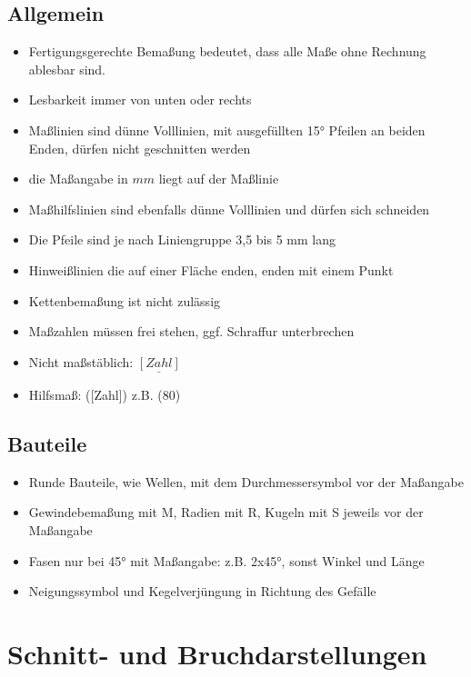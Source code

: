 \documentclass[a4paper,parskip=half*,DIV=7,fontsize=11pt]{scrartcl}
\begin{document}
\subsection{Allgemein}
\begin{itemize}
	\item Fertigungsgerechte Bemaßung bedeutet, dass alle Maße ohne Rechnung ablesbar sind.
	\item Lesbarkeit immer von unten oder rechts
	\item Maßlinien sind dünne Volllinien, mit ausgefüllten 15° Pfeilen an beiden Enden, dürfen nicht geschnitten werden
	\item die Maßangabe in $mm$ liegt auf der Maßlinie
	\item Maßhilfslinien sind ebenfalls dünne Volllinien und dürfen sich schneiden
	\item Die Pfeile sind je nach Liniengruppe 3,5 bis 5 mm lang
	\item Hinweißlinien die auf einer Fläche enden, enden mit einem Punkt
	\item Kettenbemaßung ist nicht zulässig
	\item Maßzahlen müssen frei stehen, ggf. Schraffur unterbrechen
	\item Nicht maßstäblich: $\underline{[Zahl]}$
	\item Hilfsmaß: ([Zahl]) z.B. (80)
\end{itemize}
	
\subsection{Bauteile}
\begin{itemize}
	\item Runde Bauteile, wie Wellen, mit dem Durchmessersymbol vor der Maßangabe
	\item Gewindebemaßung mit M, Radien mit R, Kugeln mit S jeweils vor der Maßangabe
	\item Fasen nur bei 45° mit Maßangabe: z.B. 2x45°, sonst Winkel und Länge
	\item Neigungssymbol und Kegelverjüngung in Richtung des Gefälle
\end{itemize}	
	
\section{Schnitt- und Bruchdarstellungen}
\end{document}
